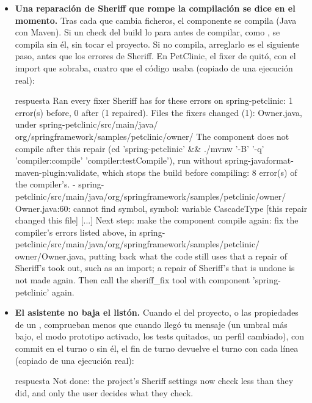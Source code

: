 \documentclass[11pt,a4paper]{article}
\begin{document}
\begin{itemize}
\begin{command}[basicstyle=\ttfamily\footnotesize]{respuesta}
outdated: 12.3.1 -> 14.3.0. [JavaPomOutdatedDependency]
\end{command}
  \item \textbf{Una reparación de Sheriff que rompe la compilación se dice en
        el momento.} Tras cada  que cambia ficheros, el
        componente se compila (Java con Maven). Si un check del build lo para
        antes de compilar, como , se compila
        sin él, sin tocar el proyecto. Si no compila, arreglarlo es el
        siguiente paso, antes que los errores de Sheriff. En PetClinic, el
        fixer de  quitó, con el import que sobraba, cuatro
        que el código usaba (copiado de una ejecución real):
\begin{command}[basicstyle=\ttfamily\footnotesize]{respuesta}
Ran every fixer Sheriff has for these errors on spring-petclinic: 1 error(s)
before, 0 after (1 repaired).
Files the fixers changed (1): Owner.java, under spring-petclinic/src/main/java/
org/springframework/samples/petclinic/owner/
The component does not compile after this repair (cd 'spring-petclinic' &&
./mvnw '-B' '-q' 'compiler:compile' 'compiler:testCompile'), run without
spring-javaformat-maven-plugin:validate, which stops the build before
compiling: 8 error(s) of the compiler's.
  - spring-petclinic/src/main/java/org/springframework/samples/petclinic/owner/
    Owner.java:60: cannot find symbol, symbol: variable CascadeType  [this
    repair changed this file]
  [...]
Next step: make the component compile again: fix the compiler's errors listed
above, in spring-petclinic/src/main/java/org/springframework/samples/petclinic/
owner/Owner.java, putting back what the code still uses that a repair of
Sheriff's took out, such as an import; a repair of Sheriff's that is undone is
not made again. Then call the sheriff_fix tool with component
'spring-petclinic' again.
\end{command}
  \item \textbf{El asistente no baja el listón.} Cuando el
         del proyecto, o las propiedades
         de un , comprueban menos que cuando
        llegó tu mensaje (un umbral más bajo, el modo prototipo activado, los
        tests quitados, un perfil cambiado), con commit en el turno o sin él,
        el fin de turno devuelve el turno con cada línea (copiado de una
        ejecución real):
\begin{command}[basicstyle=\ttfamily\footnotesize]{respuesta}
Not done: the project's Sheriff settings now check less than they did, and only the
user decides what they check.


\end{command}
\end{itemize}
\end{document}
